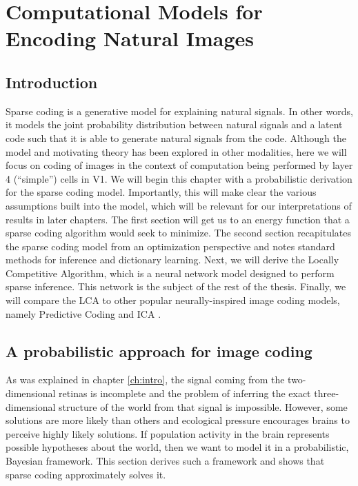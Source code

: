 \chapter{Computational Models for Encoding Natural Images}

\section{Introduction}
Sparse coding is a generative model for explaining natural signals. In other words, it models the joint probability distribution between natural signals and a latent code such that it is able to generate natural signals from the code. Although the model and motivating theory has been explored in other modalities, here we will focus on coding of images in the context of computation being performed by layer 4 (``simple'') cells in V1. We will begin this chapter with a probabilistic derivation for the sparse coding model. Importantly, this will make clear the various assumptions built into the model, which will be relevant for our interpretations of results in later chapters. The first section will get us to an energy function that a sparse coding algorithm would seek to minimize. The second section recapitulates the sparse coding model from an optimization perspective and notes standard methods for inference and dictionary learning. Next, we will derive the Locally Competitive Algorithm, which is a neural network model designed to perform sparse inference. This network is the subject of the rest of the thesis. Finally, we will compare the LCA to other popular neurally-inspired image coding models, namely Predictive Coding \parencite{rao1999predictive} and ICA \parencite{bell1997independent}.

\section{A probabilistic approach for image coding}
As was explained in chapter \ref{ch:intro}, the signal coming from the two-dimensional retinas is incomplete and the problem of inferring the exact three-dimensional structure of the world from that signal is impossible. However, some solutions are more likely than others and ecological pressure encourages brains to perceive highly likely solutions. If population activity in the brain represents possible hypotheses about the world, then we want to model it in a probabilistic, Bayesian framework. This section derives such a framework and shows that sparse coding approximately solves it.

